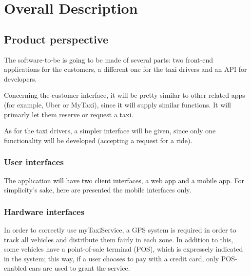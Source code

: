 \pagebreak
\section{Overall Description}
\subsection{Product perspective}

The software-to-be is going to be made of several parts: two front-end applications for the customers, a different one for the taxi drivers and an API for developers. 

Concerning the customer interface, it will be pretty similar to other related apps (for example, Uber or MyTaxi), since it will supply similar functions. It will primarly let them reserve or request a taxi.

As for the taxi drivers, a simpler interface will be given, since only one functionality will be developed (accepting a request for a ride).
 
\subsubsection{User interfaces}
The application will have two client interfaces, a web app and a mobile app. For simplicity's sake, here are presented the mobile interfaces only.

\pagebreak
{}




\pagebreak
\subsubsection{Hardware interfaces}
In order to correctly use myTaxiService, a GPS system is required in order to track all vehicles and distribute them fairly in each zone. In addition to this, some vehicles have a point-of-sale terminal (POS), which is expressely indicated in the system; this way, if a user chooses to pay with a credit card, only POS-enabled cars are used to grant the service.

